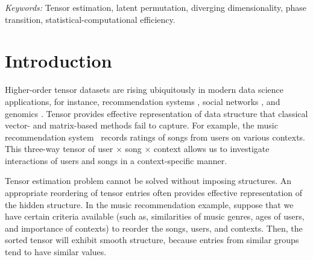 \documentclass[12pt]{article}
\theoremstyle{definition}
\begin{document}
\noindent%
{\it Keywords:} Tensor estimation, latent permutation, diverging dimensionality, phase transition, statistical-computational efficiency. 
\vfill

\newpage
{} %
\section{Introduction}
\label{sec:intro}
Higher-order tensor datasets are rising ubiquitously in modern data science applications, for instance, recommendation systems \citep{bi2018multilayer}, social networks \citep{bickel2009nonparametric},
and genomics \citep{wang2019three}. Tensor provides effective representation of data structure that classical vector- and matrix-based methods fail to capture. For example, the music recommendation system~\citep{baltrunas2011incarmusic} records ratings of songs from users on various contexts. This three-way tensor of user $\times$ song $\times$ context allows us to investigate interactions of users and songs in a context-specific manner.


Tensor estimation problem cannot be solved without imposing structures. An appropriate reordering of tensor entries often provides effective representation of the hidden structure. In the music recommendation example, suppose that we have certain criteria available (such as, similarities of music genres, ages of users, and importance of contexts) to reorder the songs, users, and contexts. Then, the sorted tensor will exhibit smooth structure, because entries from similar groups tend to have similar values. 

\end{document}
